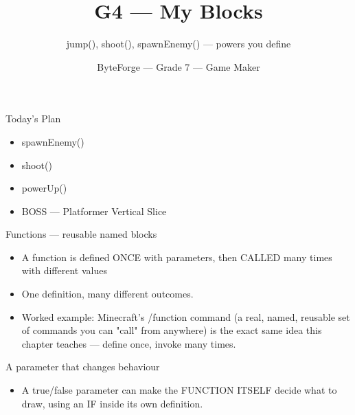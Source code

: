\documentclass[aspectratio=169]{beamer}
\title{G4 — My Blocks}
\subtitle{jump(), shoot(), spawnEnemy() — powers you define}
\author{ByteForge --- Grade 7 --- Game Maker}
\date{}
\begin{document}
\begin{frame}
    \titlepage
\end{frame}

\begin{frame}{Today's Plan}
    \begin{itemize}
        \item spawnEnemy()
        \item shoot()
        \item powerUp()
        \item[$\bigstar$] BOSS --- Platformer Vertical Slice
    \end{itemize}
\end{frame}

\begin{frame}{Functions — reusable named blocks}
    \large
    \begin{itemize}
        \item A function is defined ONCE with parameters, then CALLED many times with different values
        \item One definition, many different outcomes.
        \item Worked example: Minecraft's /function command (a real, named, reusable set of commands you can "call" from anywhere) is the exact same idea this chapter teaches — define once, invoke many times.
    \end{itemize}

    \begin{center}
    \end{center}
\end{frame}


\begin{frame}{A parameter that changes behaviour}
    \large
    \begin{itemize}
        \item A true/false parameter can make the FUNCTION ITSELF decide what to draw, using an IF inside its own definition.
    \end{itemize}
\end{frame}
\end{document}
